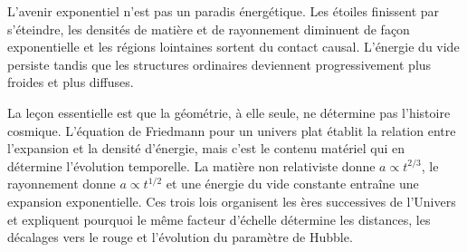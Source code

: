 L’avenir exponentiel n’est pas un paradis énergétique. Les étoiles finissent par s’éteindre, les densités de matière et de rayonnement diminuent de façon exponentielle et les régions lointaines sortent du contact causal. L’énergie du vide persiste tandis que les structures ordinaires deviennent progressivement plus froides et plus diffuses.

\begin{classroomqa}
\end{classroomqa}

La leçon essentielle est que la géométrie, à elle seule, ne détermine pas l’histoire cosmique. L’équation de Friedmann pour un univers plat établit la relation entre l’expansion et la densité d’énergie, mais c’est le contenu matériel qui en détermine l’évolution temporelle. La matière non relativiste donne \(a\propto t^{2/3}\), le rayonnement donne \(a\propto t^{1/2}\) et une énergie du vide constante entraîne une expansion exponentielle. Ces trois lois organisent les ères successives de l’Univers et expliquent pourquoi le même facteur d’échelle détermine les distances, les décalages vers le rouge et l’évolution du paramètre de Hubble.
